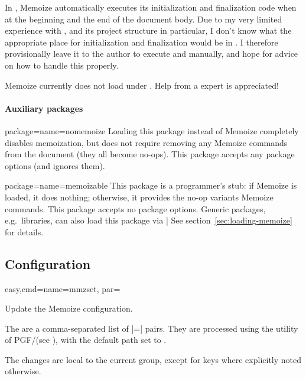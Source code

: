 \documentclass[a4paper,11pt]{article}
\begin{document}
In , Memoize automatically executes its initialization and
finalization code when at the beginning and the end of the document body.  Due
to my very limited experience with , and its project structure
in particular, I don't know what the appropriate place for initialization and
finalization would be in .  I therefore provisionally leave it
to the author to execute  and
 manually, and hope for advice
on how to handle this properly.

\begin{tcolorbox}[warning,title=Out of order]
  Memoize currently does not load under .  Help from
  a  expert is appreciated!
\end{tcolorbox}

\paragraph{Auxiliary packages}

\begin{doc}{package={name=nomemoize}}
  Loading this package instead of Memoize completely disables memoization, but
  does not require removing any Memoize commands from the document (they all
  become no-ops).  This package accepts any package options (and ignores them).
\end{doc}

\begin{doc}{package={name=memoizable}}
  This package is a programmer's stub: if Memoize is loaded, it does nothing;
  otherwise, it provides the no-op variants Memoize commands.  This package
  accepts no package options.  Generic packages, e.g.\ \TikZ libraries, can
  also load this package via |  See
  section~\ref{sec:loading-memoize} for details.
\end{doc}


\subsection{Configuration}
\label{sec:ref:configuration}


\begin{doc}{easy,cmd={name=mmzset, par=}}
  
  Update the Memoize configuration.

  The  are a comma-separated list of |=|
  pairs.  They are processed using the  utility of PGF/\TikZ (see
  ), with the default path set to .

  The changes are local to the current  group, except for keys
  where explicitly noted otherwise.
\end{doc}
\end{document}
